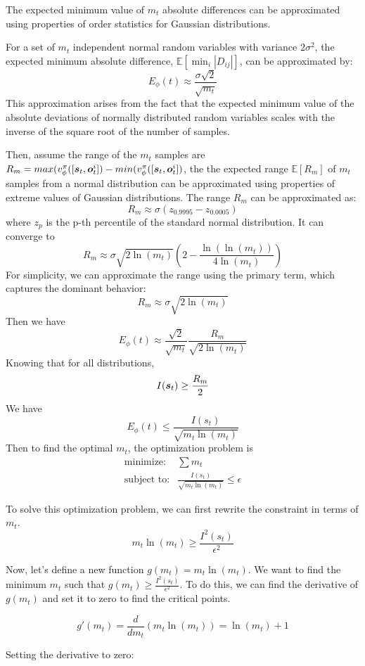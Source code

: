 The expected minimum value of \(m_t\) absolute differences can be approximated using properties of order statistics for Gaussian distributions.

For a set of \(m_t\) independent normal random variables with variance \(2\sigma^2\), the expected minimum absolute difference, \(\mathbb{E}[\min_{i} |D_{ij}|]\), can be approximated by:
\[
E_{\phi}(t) \approx \frac{\sigma \sqrt{2}}{\sqrt{m_t}}
\]
This approximation arises from the fact that the expected minimum value of the absolute deviations of normally distributed random variables scales with the inverse of the square root of the number of samples.

Then, assume the range of the $m_t$ samples are $R_m=max(v_{\phi}^{\pi}([{\bm{s}}_t, {\bm{o}}_t^{i}])-min(v_{\phi}^{\pi}([{\bm{s}}_t, {\bm{o}}_t^{i}])$, the the expected range \( \mathbb{E}[R_m] \) of \( m_t \) samples from a normal distribution can be approximated using properties of extreme values of Gaussian distributions.
The range \( R_m \) can be approximated as:
\[
R_m \approx \sigma (z_{0.9995} - z_{0.0005})
\]
where \( z_{p} \) is the p-th percentile of the standard normal distribution. It can converge to 
\[
R_m \approx \sigma \sqrt{2 \ln(m_t)} \left( 2 - \frac{\ln(\ln(m_t))}{4 \ln(m_t)} \right)
\]
For simplicity, we can approximate the range using the primary term, which captures the dominant behavior:
\[
R_m \approx \sigma \sqrt{2 \ln(m_t)}
\]
Then we have 
\[
E_{\phi}(t) \approx \frac{\sqrt{2}}{{\sqrt{m_t}}}\frac{R_m}{\sqrt{2 \ln(m_t)}}
\]
Knowing that for all distributions, 
\[
I({\bm{s}}_t) \ge \frac{R_m}{2}
\]
We have 
\[
E_{\phi}(t) \le \frac{I(s_t)}{\sqrt{m_t\ln(m_t)}}
\]
Then to find the optimal $m_t$, the optimization problem is
\begin{align*}
\text{minimize:} & \sum m_t \\
\text{subject to:} & \frac{I(s_t)}{\sqrt{m_t\ln(m_t)}} \leq \epsilon
\end{align*}

To solve this optimization problem, we can first rewrite the constraint in terms of $m_t$.
\[
m_t\ln(m_t) \geq \frac{I^2(s_t)}{\epsilon^2}
\]

Now, let's define a new function $g(m_t) = m_t\ln(m_t)$. We want to find the minimum $m_t$ such that $g(m_t) \geq \frac{I^2(s_t)}{\epsilon^2}$. To do this, we can find the derivative of $g(m_t)$ and set it to zero to find the critical points.

\[
g'(m_t) = \frac{d}{dm_t}(m_t\ln(m_t)) = \ln(m_t) + 1
\]

Setting the derivative to zero:

